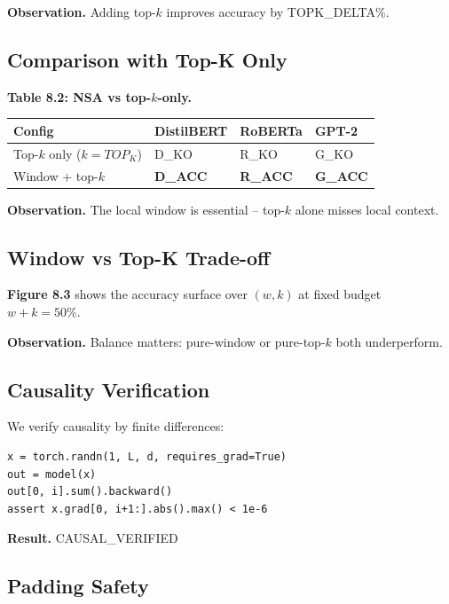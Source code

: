 \textbf{Observation.} Adding top-$k$ improves accuracy by {{TOPK\_DELTA}}\%.

\subsection{Comparison with Top-K Only}

\textbf{Table 8.2: NSA vs top-$k$-only.}

\begin{table}[H]
\centering
\small
\begin{tabular}{llll}
\toprule
\textbf{Config} & \textbf{DistilBERT} & \textbf{RoBERTa} & \textbf{GPT-2} \\
\midrule
Top-$k$ only ($k={TOP_K}$) & {{D\_KO}} & {{R\_KO}} & {{G\_KO}} \\
Window + top-$k$ & \textbf{{{D\_ACC}}} & \textbf{{{R\_ACC}}} & \textbf{{{G\_ACC}}} \\
\bottomrule
\end{tabular}
\end{table}

\textbf{Observation.} The local window is essential -- top-$k$ alone misses local 
context.

\subsection{Window vs Top-K Trade-off}

\textbf{Figure 8.3} shows the accuracy surface over $(w, k)$ at fixed budget 
$w + k = 50\%$.

\textbf{Observation.} Balance matters: pure-window or pure-top-$k$ both underperform.

\subsection{Causality Verification}

We verify causality by finite differences:

\begin{lstlisting}
x = torch.randn(1, L, d, requires_grad=True)
out = model(x)
out[0, i].sum().backward()
assert x.grad[0, i+1:].abs().max() < 1e-6
\end{lstlisting}

\textbf{Result.} {{CAUSAL\_VERIFIED}}

\subsection{Padding Safety}

